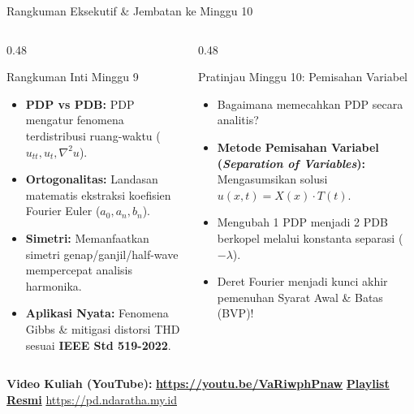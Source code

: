 \documentclass[aspectratio=169,10pt]{beamer}
\begin{document}
\begin{frame}{Rangkuman Eksekutif \& Jembatan ke Minggu 10}
  \begin{columns}[t]
    \begin{column}{0.48\textwidth}
      \begin{block}{Rangkuman Inti Minggu 9}
        \begin{itemize}
          \item \textbf{PDP vs PDB:} PDP mengatur fenomena terdistribusi ruang-waktu ($u_{tt}, u_t, \nabla^2 u$).
          \item \textbf{Ortogonalitas:} Landasan matematis ekstraksi koefisien Fourier Euler ($a_0, a_n, b_n$).
          \item \textbf{Simetri:} Memanfaatkan simetri genap/ganjil/half-wave mempercepat analisis harmonika.
          \item \textbf{Aplikasi Nyata:} Fenomena Gibbs \& mitigasi distorsi THD sesuai \textbf{IEEE Std 519-2022}.
        \end{itemize}
      \end{block}
    \end{column}
    \begin{column}{0.48\textwidth}
      \begin{alertblock}{Pratinjau Minggu 10: Pemisahan Variabel}
        \begin{itemize}
          \item Bagaimana memecahkan PDP secara analitis?
          \item \textbf{Metode Pemisahan Variabel (\textit{Separation of Variables}):} Mengasumsikan solusi $u(x,t) = X(x) \cdot T(t)$.
          \item Mengubah 1 PDP menjadi 2 PDB berkopel melalui konstanta separasi ($-\lambda$).
          \item Deret Fourier menjadi kunci akhir pemenuhan Syarat Awal \& Batas (BVP)!
        \end{itemize}
      \end{alertblock}
    \end{column}
  \end{columns}
  \vspace{0.06cm}
  \begin{center}
    \scriptsize \textbf{Video Kuliah (YouTube):} {\color{red!80!black}\textbf{\url{https://youtu.be/VaRiwphPnaw}}} \quad \textbar \quad \href{https://www.youtube.com/playlist?list=PLS5oOZWXZeTw}{\color{unibblue}\textbf{Playlist Resmi}} \quad \textbar \quad \url{https://pd.ndaratha.my.id}
  \end{center}
\end{frame}
\end{document}
